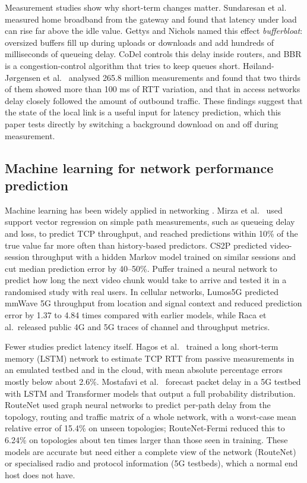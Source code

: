 \documentclass[pdflatex,sn-mathphys-num]{sn-jnl}
\begin{document}
Measurement studies show why short-term changes matter. Sundaresan et al.~\cite{sundaresan2011broadband} measured home broadband from the gateway and found that latency under load can rise far above the idle value. Gettys and Nichols \cite{gettys2012bufferbloat} named this effect \emph{bufferbloat}: oversized buffers fill up during uploads or downloads and add hundreds of milliseconds of queueing delay. CoDel \cite{nichols2012codel} controls this delay inside routers, and BBR \cite{cardwell2017bbr} is a congestion-control algorithm that tries to keep queues short. Høiland-Jørgensen et al.~\cite{hoiland2016latency} analysed 265.8 million measurements and found that two thirds of them showed more than 100 ms of RTT variation, and that in access networks delay closely followed the amount of outbound traffic. These findings suggest that the state of the local link is a useful input for latency prediction, which this paper tests directly by switching a background download on and off during measurement.

\subsection{Machine learning for network performance prediction}

Machine learning has been widely applied in networking \cite{boutaba2018survey,mestres2017kdn}. Mirza et al.~\cite{mirza2007tcp} used support vector regression on simple path measurements, such as queueing delay and loss, to predict TCP throughput, and reached predictions within 10\% of the true value far more often than history-based predictors. CS2P \cite{sun2016cs2p} predicted video-session throughput with a hidden Markov model trained on similar sessions and cut median prediction error by 40--50\%. Puffer \cite{yan2020puffer} trained a neural network to predict how long the next video chunk would take to arrive and tested it in a randomised study with real users. In cellular networks, Lumos5G \cite{narayanan2020lumos5g} predicted mmWave 5G throughput from location and signal context and reduced prediction error by 1.37 to 4.84 times compared with earlier models, while Raca et al.\ released public 4G \cite{raca2018lte} and 5G \cite{raca2020nr} traces of channel and throughput metrics.

Fewer studies predict latency itself. Hagos et al.~\cite{hagos2019rtt} trained a long short-term memory (LSTM) network \cite{hochreiter1997lstm} to estimate TCP RTT from passive measurements in an emulated testbed and in the cloud, with mean absolute percentage errors mostly below about 2.6\%. Mostafavi et al.~\cite{mostafavi2025delay} forecast packet delay in a 5G testbed with LSTM and Transformer models that output a full probability distribution. RouteNet \cite{rusek2020routenet} used graph neural networks to predict per-path delay from the topology, routing and traffic matrix of a whole network, with a worst-case mean relative error of 15.4\% on unseen topologies; RouteNet-Fermi \cite{ferriol2023fermi} reduced this to 6.24\% on topologies about ten times larger than those seen in training. These models are accurate but need either a complete view of the network (RouteNet) or specialised radio and protocol information (5G testbeds), which a normal end host does not have.
\end{document}
